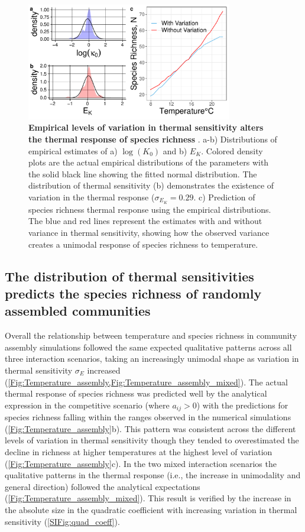 \documentclass{article}
\begin{document}
\begin{figure}[H]
    \centering
    \includegraphics[width = 0.8\textwidth]{docs/Figures/MTE_fig.pdf}
    \caption{\textbf{Empirical levels of variation in thermal sensitivity alters the thermal response of species richness }. a-b) Distributions of empirical estimates of a) $\log(K_0)$ and b) $E_K$. Colored density plots are the actual empirical distributions of the parameters with the solid black line showing the fitted normal distribution. The distribution of thermal sensitivity (b) demonstrates the existence of variation in the thermal response ($\sigma_{E_K} = 0.29$. c) Prediction of species richness thermal response using the empirical distributions. The blue and red lines represent the estimates with and without variance in thermal sensitivity, showing how the observed variance creates a unimodal response of species richness to temperature.}
    \label{Fig:TPC_data}
\end{figure}

\subsection*{The distribution of thermal sensitivities predicts the species richness of randomly assembled communities}

Overall the relationship between temperature and species richness in community assembly simulations followed the same expected qualitative patterns across all three interaction scenarios, taking an increasingly unimodal shape as variation in thermal sensitivity $\sigma_E$ increased (\cref{Fig:Temperature_assembly,Fig:Temperature_assembly_mixed}). The actual thermal response of species richness was predicted well by the analytical expression in the competitive scenario (where $a_{ij} > 0$) with the predictions for species richness falling within the ranges observed in the numerical simulations (\cref{Fig:Temperature_assembly}b). This pattern was consistent across the different levels of variation in thermal sensitivity though they tended to overestimated the decline in richness at higher temperatures at the highest level of variation (\cref{Fig:Temperature_assembly}c). In the two mixed interaction scenarios the qualitative patterns in the thermal response (i.e., the increase in unimodality and general direction) followed the analytical expectations (\cref{Fig:Temperature_assembly_mixed}). This result is verified by the increase in the absolute size in the quadratic coefficient with increasing variation in thermal sensitivity (\cref{SIFig:quad_coeff}).
\end{document}
